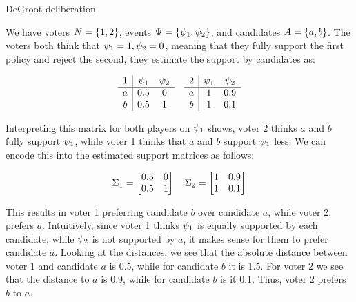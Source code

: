 \begin{example}{DeGroot deliberation} {}

	We have voters \(N = \{1,2\}\), events \(\Psi =
	\{\psi_{1}, \psi_{2}\}\), and candidates \(A =
	\{a,b\}\). The voters both think that \(\psi_{1} = 1, \psi_{2} =
	0\), meaning that they fully support the first policy and reject the
	second, they estimate the support by candidates as:

	\[
		\begin{array}{c|cc}
			1 & \psi_1 & \psi_2 \\ \hline
			a & 0.5       & 0         \\
			b & 0.5       & 1         \\
		\end{array}
		\hspace{1em}
		\begin{array}{c|cc}
			2 & \psi_1 & \psi_2 \\ \hline
			a & 1         & 0.9       \\
			b & 1         & 0.1       \\
		\end{array}
	\]

	Interpreting this matrix for both players on $\psi_1$ shows, voter 2 thinks $a$ and $b$ fully support $\psi_1$, while voter 1 thinks that $a$ and $b$  support $\psi_1$ less. We can encode this into the estimated support matrices as follows:

	\[ \Sigma_1 =\begin{bmatrix} 0.5 & 0 \\
                0.5 & 1 \\\end{bmatrix}\quad
		\Sigma_2 =\begin{bmatrix} 1 & 0.9
                \\ 1 & 0.1 \\\end{bmatrix} \]

	This results in voter 1 preferring candidate $b$ over candidate $a$, while
	voter 2, prefers $a$. Intuitively, since voter 1 thinks $\psi_{1}$ is
	equally supported by each candidate, while $\psi_{2}$ is not supported by
	$a$, it makes sense for them to prefer candidate $a$. Looking at the distances,
	we see that the absolute distance between voter 1 and candidate $a$ is 0.5,
	while for candidate $b$ it is 1.5. For voter 2 we see that the distance to
	$a$ is 0.9, while for candidate $b$ is it 0.1. Thus, voter 2 prefers $b$ to
	$a$.


\end{example}
